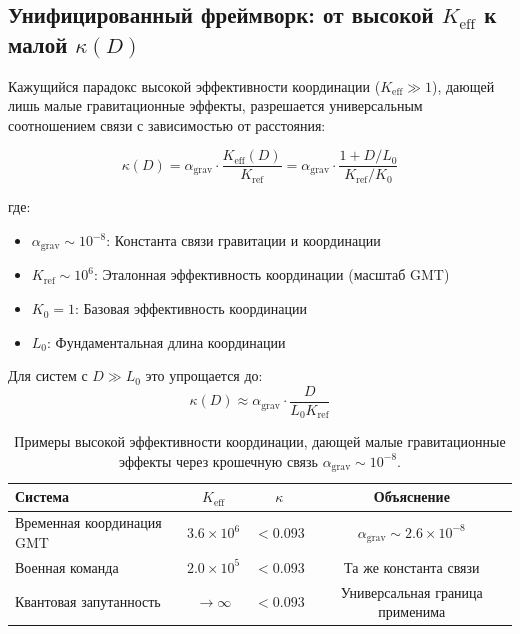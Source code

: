 \documentclass[11pt,a4paper]{article}
\begin{document}
	\subsection{Унифицированный фреймворк: от высокой $K_{\mathrm{eff}}$ к малой $\kappa(D)$}
	
	Кажущийся парадокс высокой эффективности координации ($K_{\mathrm{eff}} \gg 1$), 
	дающей лишь малые гравитационные эффекты, разрешается универсальным соотношением 
	связи с зависимостью от расстояния:
	
	\begin{equation}
		\boxed{\kappa(D) = \alpha_{\text{grav}} \cdot \frac{K_{\mathrm{eff}}(D)}{K_{\text{ref}}} 
			= \alpha_{\text{grav}} \cdot \frac{1 + D/L_0}{K_{\text{ref}}/K_0}}
	\end{equation}
	
	где:
	\begin{itemize}
		\item $\alpha_{\text{grav}} \sim 10^{-8}$: Константа связи гравитации и координации
		\item $K_{\text{ref}} \sim 10^6$: Эталонная эффективность координации (масштаб GMT)
		\item $K_0 = 1$: Базовая эффективность координации
		\item $L_0$: Фундаментальная длина координации
	\end{itemize}
	
	Для систем с $D \gg L_0$ это упрощается до:
	\begin{equation}
		\kappa(D) \approx \alpha_{\text{grav}} \cdot \frac{D}{L_0 K_{\text{ref}}}
	\end{equation}
	
	\begin{table}[htbp]
		\centering
		\begin{tabular}{lccc}
			\toprule
			\textbf{Система} & \textbf{$K_{\mathrm{eff}}$} & \textbf{$\kappa$} & \textbf{Объяснение} \\
			\midrule
			Временная координация GMT & $3.6\times10^6$ & $<0.093$ & $\alpha_{\text{grav}} \sim 2.6\times10^{-8}$ \\
			Военная команда & $2.0\times10^5$ & $<0.093$ & Та же константа связи \\
			Квантовая запутанность & $\to\infty$ & $<0.093$ & Универсальная граница применима \\
			\bottomrule
		\end{tabular}
		\caption{Примеры высокой эффективности координации, дающей малые гравитационные эффекты через крошечную связь $\alpha_{\text{grav}} \sim 10^{-8}$.}
	\end{table}
	
\end{document}
